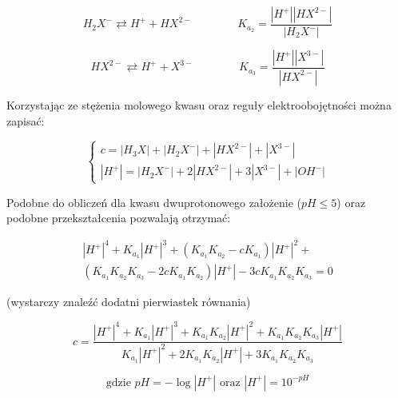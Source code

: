 \documentclass[polish,polish,a4paper,12pt]{article}
\begin{document}
\begin{enumerate}
		\begin{equation*}
			H_2X^- \rightleftarrows H^+ + HX^{2-} \hspace{4em} K_{a_2} = \frac{|H^+||HX^{2-}|}{|H_2X^-|}
		\end{equation*}
		
		\begin{equation*}
			HX^{2-} \rightleftarrows H^+ + X^{3-} \hspace{4em} K_{a_3} = \frac{|H^+||X^{3-}|}{|HX^{2-}|}
		\end{equation*}
		
		Korzystając ze stężenia molowego kwasu oraz reguły elektroobojętności można zapisać:
		
		\begin{equation*}
			\begin{cases}
				c = |H_3X| + |H_2X^-| + |HX^{2-}| + |X^{3-}|\\
				|H^+| =|H_2X^-| + 2|HX^{2-}| + 3|X^{3-}| + |OH^-|
			\end{cases}
		\end{equation*}
		
		Podobne do obliczeń dla kwasu dwuprotonowego założenie ($pH \leqslant 5$) oraz podobne przekształcenia pozwalają otrzymać:
		
		\begin{equation*}
			\begin{gathered}
				|H^+|^4 + K_{a_1}|H^+|^3 + \left(K_{a_1}K_{a_2} - cK_{a_1}\right)|H^+|^2 + \\
				\left(K_{a_1}K_{a_2}K_{a_3} - 2cK_{a_1}K_{a_2}\right)|H^+| - 3cK_{a_1}K_{a_2}K_{a_3} = 0
			\end{gathered}
		\end{equation*}
		
		\begin{center}
			(wystarczy znaleźć dodatni pierwiastek równania)
		\end{center}
		
		\begin{equation*}
			c = \frac{|H^+|^4 + K_{a_1}|H^+|^3 + K_{a_1}K_{a_2}|H^+|^2 + K_{a_1}K_{a_2}K_{a_3}|H^+|}{K_{a_1}|H^+|^2 + 2K_{a_1}K_{a_2}|H^+| + 3K_{a_1}K_{a_2}K_{a_3}}
		\end{equation*}
		
		\begin{equation*}
			\text{gdzie } pH = -\log |H^+| \text{ oraz } |H^+| = 10^{-pH}
		\end{equation*}
	\end{enumerate}
	
\end{document}
